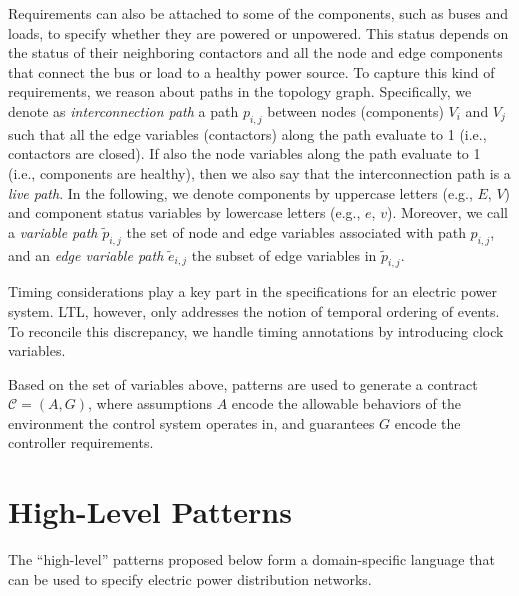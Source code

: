 \documentclass[journal]{IEEEtran}
\newcommand{\pfr}[1]{\mathcal{#1}}
\begin{document}
Requirements can also be attached to some of the components, such as buses and loads, to specify whether they are powered or unpowered. This status depends on the status of their neighboring
contactors and all the node and edge components that connect the bus or load to a healthy power source. 
To capture this kind of requirements, we reason about paths in the topology graph. Specifically, we denote as \emph{interconnection path} a path $p_{i,j}$ between nodes (components) $V_i$ and $V_j$ such that all the edge variables (contactors) along the path evaluate to 1 (i.e., contactors are closed). If also the node variables along the path evaluate to 1 (i.e., components are healthy), then we also say that the interconnection path is a \emph{live path}. In the following, we denote components by uppercase letters (e.g., $E$, $V$) and component status variables by lowercase letters (e.g., $e$, $v$). Moreover, we call a \emph{variable path} $\tilde{p}_{i,j}$ the set of node and edge variables associated with path $p_{i,j}$, and an \emph{edge variable path} $\tilde{e}_{i,j}$ the subset of edge variables in $\tilde{p}_{i,j}$.

Timing considerations play a key part in the specifications for an electric
power system. LTL, however, only addresses the notion of temporal ordering of
events. To reconcile this discrepancy, we handle timing annotations 
by introducing clock variables. 

Based on the set of variables above, patterns are used to generate a
contract $\pfr{C} = (A, G)$, where assumptions $A$ encode the allowable
behaviors of the environment the control system operates in, and guarantees
$G$ encode the controller requirements. 

\section{High-Level Patterns}

The ``high-level'' patterns proposed below form a domain-specific language that can be 
used to specify electric power distribution networks. 
\end{document}
